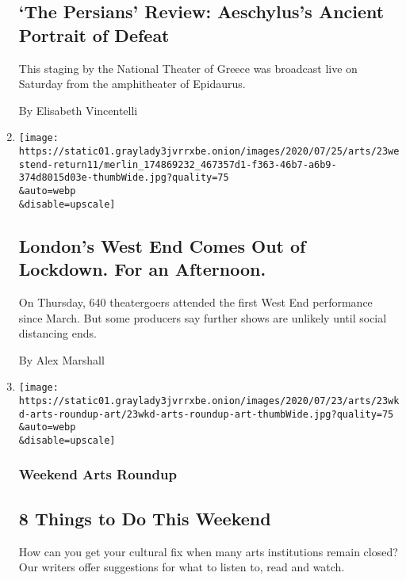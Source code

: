 \begin{enumerate}
  \hypertarget{the-persians-review-aeschyluss-ancient-portrait-of-defeat}{%
  \subsection{`The Persians' Review: Aeschylus's Ancient Portrait of
  Defeat}\label{the-persians-review-aeschyluss-ancient-portrait-of-defeat}}

  This staging by the National Theater of Greece was broadcast live on
  Saturday from the amphitheater of Epidaurus.

  By Elisabeth Vincentelli
\item
  \href{/2020/07/23/theater/west-end-london-virus.html}{}

  \texttt{[image: https://static01.graylady3jvrrxbe.onion/images/2020/07/25/arts/23westend-return11/merlin\_174869232\_467357d1-f363-46b7-a6b9-374d8015d03e-thumbWide.jpg?quality=75\\\&auto=webp\\\&disable=upscale]}

  \hypertarget{londons-west-end-comes-out-of-lockdown-for-an-afternoon}{%
  \subsection{London's West End Comes Out of Lockdown. For an
  Afternoon.}\label{londons-west-end-comes-out-of-lockdown-for-an-afternoon}}

  On Thursday, 640 theatergoers attended the first West End performance
  since March. But some producers say further shows are unlikely until
  social distancing ends.

  By Alex Marshall
\item
  \href{/2020/07/23/arts/things-to-do-weekend-coronavirus.html}{}

  \texttt{[image: https://static01.graylady3jvrrxbe.onion/images/2020/07/23/arts/23wkd-arts-roundup-art/23wkd-arts-roundup-art-thumbWide.jpg?quality=75\\\&auto=webp\\\&disable=upscale]}

  \hypertarget{weekend-arts-roundup}{%
  \subsubsection{Weekend Arts Roundup}\label{weekend-arts-roundup}}

  \hypertarget{8-things-to-do-this-weekend}{%
  \subsection{8 Things to Do This
  Weekend}\label{8-things-to-do-this-weekend}}

  How can you get your cultural fix when many arts institutions remain
  closed? Our writers offer suggestions for what to listen to, read and
  watch.
\end{enumerate}

